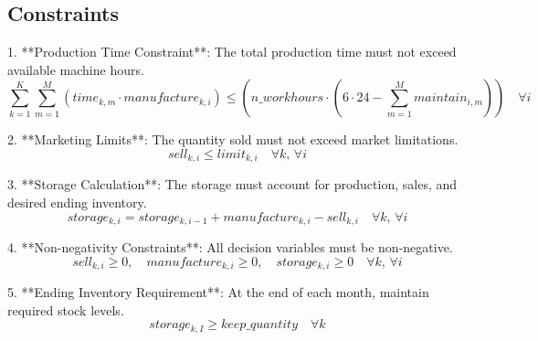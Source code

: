 \documentclass{article}
\begin{document}
\subsection*{Constraints}
1. **Production Time Constraint**: The total production time must not exceed available machine hours.
\[
\sum_{k=1}^{K} \sum_{m=1}^{M} (time_{k,m} \cdot manufacture_{k,i}) \leq (n\_workhours \cdot (6 \cdot 24 - \sum_{m=1}^{M} maintain_{i,m})) \quad \forall i
\]

2. **Marketing Limits**: The quantity sold must not exceed market limitations.
\[
sell_{k,i} \leq limit_{k,i} \quad \forall k, \, \forall i
\]

3. **Storage Calculation**: The storage must account for production, sales, and desired ending inventory.
\[
storage_{k,i} = storage_{k,i-1} + manufacture_{k,i} - sell_{k,i} \quad \forall k, \, \forall i
\]

4. **Non-negativity Constraints**: All decision variables must be non-negative.
\[
sell_{k,i} \geq 0, \quad manufacture_{k,i} \geq 0, \quad storage_{k,i} \geq 0 \quad \forall k, \, \forall i
\]

5. **Ending Inventory Requirement**: At the end of each month, maintain required stock levels.
\[
storage_{k,I} \geq keep\_quantity \quad \forall k
\]
\end{document}
